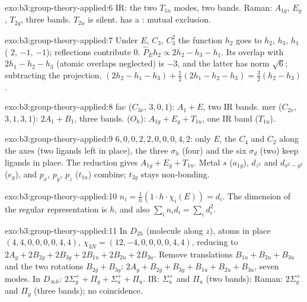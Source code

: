 \begin{solution}{exo:b3:group-theory-applied:6}
IR: the two $T_{1u}$ modes, two bands. Raman: $A_{1g}$, $E_g$, $T_{2g}$, three bands.
$T_{2u}$ is silent.  has a : mutual exclusion.
\end{solution}

\begin{solution}{exo:b3:group-theory-applied:7}
Under $E$, $C_3$, $C_3^2$ the function $h_2$ goes to $h_2$, $h_3$, $h_1$ ( 2,
$-1$, $-1$); reflections contribute 0. $\hat P_Eh_2 \propto 2h_2 - h_3 - h_1$.
Its overlap with $2h_1 - h_2 - h_3$ (atomic overlaps neglected) is $-3$, and the
latter has norm $\sqrt6$; subtracting the projection, $(2h_2 - h_1 - h_3) +
\frac12(2h_1 - h_2 - h_3) = \frac32(h_2 - h_3)$.
\end{solution}

\begin{solution}{exo:b3:group-theory-applied:8}
fac ($C_{3v}$,  $3, 0, 1$): $A_1 + E$, two IR bands. mer ($C_{2v}$,
 $3, 1, 3, 1$): $2A_1 + B_1$, three bands.  ($O_h$): $A_{1g} + E_g
+ T_{1u}$, one IR band ($T_{1u}$).
\end{solution}

\begin{solution}{exo:b3:group-theory-applied:9}
 $6, 0, 0, 2, 2, 0, 0, 0, 4, 2$: only $E$, the $C_4$ and $C_2$ along the
axes (two ligands left in place), the three $\sigma_h$ (four) and the six $\sigma_d$
(two) keep ligands in place. The reduction gives $A_{1g} + E_g + T_{1u}$. Metal $s$
($a_{1g}$), $d_{z^2}$ and $d_{x^2-y^2}$ ($e_g$), and $p_x$, $p_y$, $p_z$ ($t_{1u}$) combine;
$t_{2g}$ stays non-bonding.
\end{solution}

\begin{solution}{exo:b3:group-theory-applied:10}
$n_i = \frac1h(1\cdot h\cdot\chi_i(E)) = d_i$. The dimension of the regular
representation is $h$, and also $\sum_in_id_i = \sum_id_i^2$.
\end{solution}

\begin{solution}{exo:b3:group-theory-applied:11}
In $D_{2h}$ (molecule along $z$), atoms in place $(4, 4, 0, 0, 0, 0, 4, 4)$, $\chi_{3N}
= (12, -4, 0, 0, 0, 0, 4, 4)$, reducing to $2A_g + 2B_{2g} + 2B_{3g} + 2B_{1u} + 2B_{2u}
+ 2B_{3u}$. Remove translations $B_{1u} + B_{2u} + B_{3u}$ and the two rotations
$B_{2g} + B_{3g}$: $2A_g + B_{2g} + B_{3g} + B_{1u} + B_{2u} + B_{3u}$, seven modes.
In $D_{\infty h}$: $2\Sigma_g^+ + \Pi_g + \Sigma_u^+ + \Pi_u$. IR: $\Sigma_u^+$ and $\Pi_u$
(two bands); Raman: $2\Sigma_g^+$ and $\Pi_g$ (three bands); no coincidence.
\end{solution}

